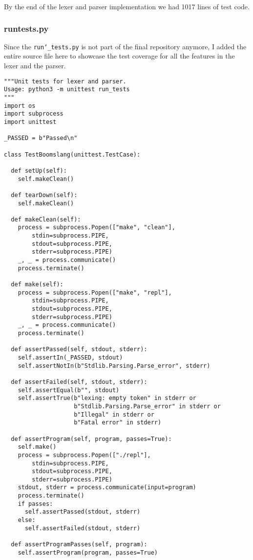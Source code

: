 \documentclass{article}
\begin{document}
By the end of the lexer and parser implementation we had 1017 lines of test code.
\subsubsection{run\textunderscore tests.py}
Since the \texttt{run\char`_tests.py} is not part of the final repository anymore, I added the entire source file here to showcase the test coverage for all the features in the lexer and the parser.
\begin{verbatim}
"""Unit tests for lexer and parser.
Usage: python3 -m unittest run_tests
"""
import os
import subprocess
import unittest

_PASSED = b"Passed\n"

class TestBoomslang(unittest.TestCase):

  def setUp(self):
    self.makeClean()

  def tearDown(self):
    self.makeClean()

  def makeClean(self):
    process = subprocess.Popen(["make", "clean"],
        stdin=subprocess.PIPE,
        stdout=subprocess.PIPE,
        stderr=subprocess.PIPE)
    _, _ = process.communicate()
    process.terminate()

  def make(self):
    process = subprocess.Popen(["make", "repl"],
        stdin=subprocess.PIPE,
        stdout=subprocess.PIPE,
        stderr=subprocess.PIPE)
    _, _ = process.communicate()
    process.terminate()

  def assertPassed(self, stdout, stderr):
    self.assertIn(_PASSED, stdout)
    self.assertNotIn(b"Stdlib.Parsing.Parse_error", stderr)

  def assertFailed(self, stdout, stderr):
    self.assertEqual(b"", stdout)
    self.assertTrue(b"lexing: empty token" in stderr or
                    b"Stdlib.Parsing.Parse_error" in stderr or
                    b"Illegal" in stderr or
                    b"Fatal error" in stderr)

  def assertProgram(self, program, passes=True):
    self.make()
    process = subprocess.Popen(["./repl"],
        stdin=subprocess.PIPE,
        stdout=subprocess.PIPE,
        stderr=subprocess.PIPE)
    stdout, stderr = process.communicate(input=program)
    process.terminate()
    if passes:
      self.assertPassed(stdout, stderr)
    else:
      self.assertFailed(stdout, stderr)

  def assertProgramPasses(self, program):
    self.assertProgram(program, passes=True)


\end{verbatim}
\end{document}
